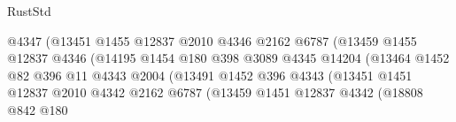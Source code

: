 \begin{lexlean}{RustStd}
\begin{coremodule}
                                              @4347
                                              (@13451
                                                @1455
                                                @12837
                                                @2010
                                                @4346
                                                @2162
                                                @6787
                                                (@13459
                                                  @1455
                                                  @12837
                                                  @4346
                                                  (@14195
                                                    @1454
                                                    @180
                                                    @398
                                                    @3089
                                                    @4345
                                                    @14204
                                                    (@13464
                                                      @1452
                                                      @82
                                                      @396
                                                      @11
                                                      @4343
                                                      @2004
                                                      (@13491
                                                        @1452
                                                        @396
                                                        @4343
                                                        (@13451
                                                          @1451
                                                          @12837
                                                          @2010
                                                          @4342
                                                          @2162
                                                          @6787
                                                          (@13459
                                                            @1451
                                                            @12837
                                                            @4342
                                                            (@18808
                                                              @842
                                                              @180

\end{coremodule}
\end{lexlean}
